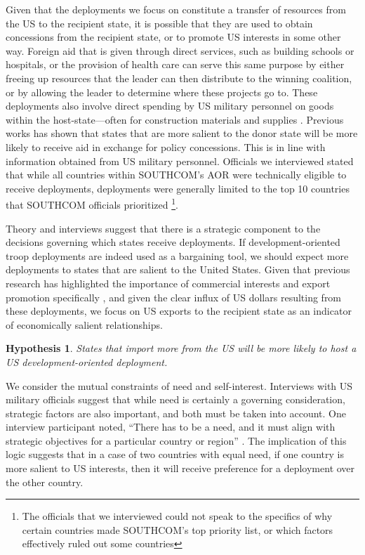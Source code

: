 \documentclass[12pt]{article}
\newtheorem{hyp}{Hypothesis}
\begin{document}
\begin{doublespace}
Given that the deployments we focus on constitute a transfer of resources from the US to the recipient state, it is possible that they are used to obtain concessions from the recipient state, or to promote US interests in some other way. Foreign aid that is given through direct services, such as building schools or hospitals, or the provision of health care can serve this same purpose by either freeing up resources that the leader can then distribute to the winning coalition, or by allowing the leader to determine where these projects go to. These deployments also involve direct spending by US military personnel on goods within the host-state---often for construction materials and supplies \cite{CPT20160309,SFC20160226}. Previous works has shown that states that are more salient to the donor state will be more likely to receive aid in exchange for policy concessions. This is in line with information obtained from US military personnel. Officials we interviewed stated that while all countries within SOUTHCOM's AOR were technically eligible to receive deployments, deployments were generally limited to the top 10 countries that SOUTHCOM officials prioritized \cite{CPT20160309}\footnote{The officials that we interviewed could not speak to the specifics of why certain countries made SOUTHCOM's top priority list, or which factors effectively ruled out some countries}.  

Theory and interviews suggest that there is a strategic component to the decisions governing which states receive deployments. If development-oriented troop deployments are indeed used as a bargaining tool, we should expect more deployments to states that are salient to the United States. Given that previous research has highlighted the importance of commercial interests and export promotion specifically \cite{FleckKilby2006,MilnerTingley2010}, and given the clear influx of US dollars resulting from these deployments, we focus on US exports to the recipient state as an indicator of economically salient relationships.    


\begin{hyp}
States that import more from the US will be more likely to host a US development-oriented deployment.
\end{hyp}


We consider the mutual constraints of need and self-interest. Interviews with US military officials suggest that while need is certainly a governing consideration, strategic factors are also important, and both must be taken into account. One interview participant noted, ``There has to be a need, and it must align with strategic objectives for a particular country or region'' \cite{CPT20160309}. The implication of this logic suggests that in a case of two countries with equal need, if one country is more salient to US interests, then it will receive preference for a deployment over the other country.


\end{doublespace}
\end{document}
